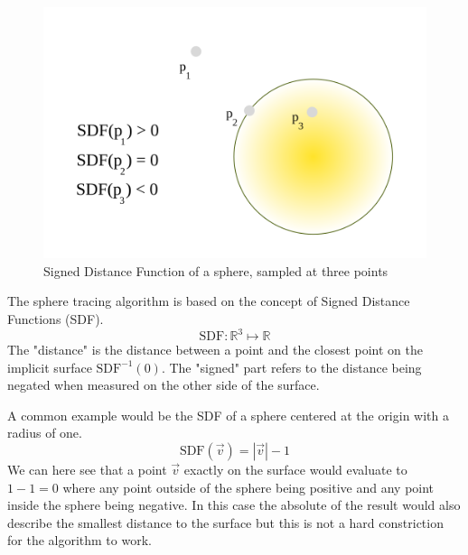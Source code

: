 		\begin{figure}
			\begin{flushright}
				\includegraphics[width=0.9\linewidth]{figure/SDF} 
			\end{flushright}
			\caption{ Signed Distance Function of a sphere, sampled at three points}
			\vspace{40pt}
		\end{figure}

		The sphere tracing algorithm is based on the concept of Signed Distance
		Functions (SDF).  $$\text{SDF}:\mathbb{R}^{3}\mapsto\mathbb{R}$$ The
		"distance" is the distance between a point and the closest point on the
		implicit surface $\text{SDF}^{-1}(0)$. The "signed" part refers to the
		distance being negated when measured on the other side of the surface. 

		A common example would be the SDF of a sphere centered at the origin with a
		radius of one. $$\text{SDF}(\vec{v}) = |\vec{v}| - 1$$ We can here see that
		a point $\vec{v}$ exactly on the surface would evaluate to $1 - 1 = 0$
		where any point outside of the sphere being positive and any point inside
		the sphere being negative. In this case the absolute of the result would
		also describe the smallest distance to the surface but this is not a hard
		constriction for the algorithm to work.

